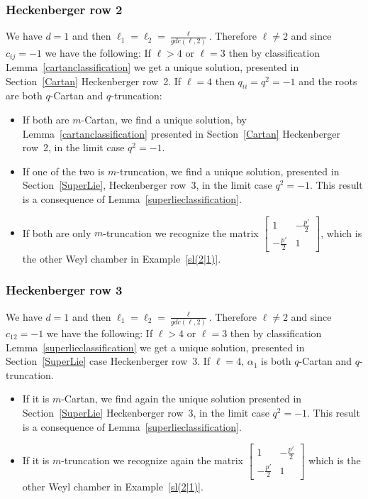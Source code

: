 \documentclass[10pt,a4paper]{amsart}
\numberwithin{equation}{section}
\begin{document}
\subsubsection*{Heckenberger row 2}
We have $d=1$ and then $\ell_1 = \ell_2 = \frac{\ell}{gdc(\ell, 2)}$. Therefore $\ell \neq 2$ and since $c_{ij}=-1$ we have the following:
If $\ell > 4$ or $\ell=3$ then by classification Lemma~\ref{cartanclassification} we get a unique solution, presented in Section~\ref{Cartan} Heckenberger row~2.
If $\ell = 4$ then $q_{ii}=q^2= -1$ and the roots are both $q$-Cartan and $q$-truncation:
\begin{itemize}\itemsep=0pt
	\item If both are $m$-Cartan, we find a unique solution, by Lemma~\ref{cartanclassification} presented in Section~\ref{Cartan} Heckenberger row~2, in the limit case $q^2=-1$.
	\item If one of the two is $m$-truncation, we find a unique solution, presented in Section~\ref{SuperLie}, Heckenberger row~3, in the limit case $q^2 = -1$. This result is a consequence of Lemma~\ref{superlieclassification}.
	\item If both are only $m$-truncation we recognize the matrix
	$\left[\begin{smallmatrix}
 1 & -\frac{p'}{2}\\
 -\frac{p'}{2} & 1
\end{smallmatrix} \right]$, which is the other Weyl chamber in Example~\ref{sl(2|1)}.
\end{itemize}

\subsubsection*{Heckenberger row 3}
We have $d=1$ and then $\ell_1 = \ell_2 = \frac{\ell}{gdc(\ell, 2)}$. Therefore $\ell \neq 2$ and since $c_{12}=-1$ we have the following:
If $\ell > 4$ or $\ell=3$ then by classification Lemma~\ref{superlieclassification} we get a unique solution, presented in Section~\ref{SuperLie} case Heckenberger row~3.
If $\ell = 4$, $\alpha_1$ is both $q$-Cartan and $q$-truncation.
\begin{itemize}\itemsep=0pt
	\item If it is $m$-Cartan, we find again the unique solution presented in Section~\ref{SuperLie} Heckenberger row~3, in the limit case $q^2=-1$.
	This result is a consequence of Lemma~\ref{superlieclassification}.
	\item If it is $m$-truncation we recognize again the matrix $\left[\begin{smallmatrix}
 1 & -\frac{p'}{2}\\
 -\frac{p'}{2} & 1
\end{smallmatrix}\right] $ which is the other Weyl chamber in Example~\ref{sl(2|1)}.
\end{itemize}
\end{document}
